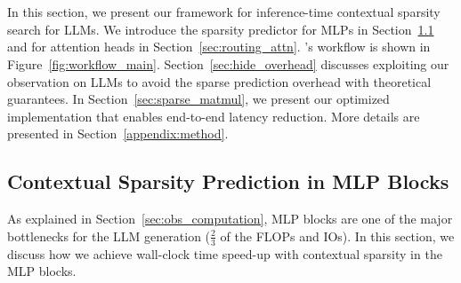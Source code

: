 
\section{\name}
\label{sec:method}

In this section, we present our framework for inference-time contextual sparsity search for LLMs.  We introduce the sparsity predictor for MLPs in Section~\ref{sec:routing_mlp} and for attention heads in Section~\ref{sec:routing_attn}. \name{}'s workflow is shown in Figure~\ref{fig:workflow_main}.  Section~\ref{sec:hide_overhead} discusses exploiting our observation on LLMs to avoid the sparse prediction overhead with theoretical guarantees. In Section~\ref{sec:sparse_matmul}, we present our optimized implementation that enables end-to-end latency reduction. More details are presented in Section~\ref{appendix:method}.





\subsection{Contextual Sparsity Prediction in MLP Blocks}
\label{sec:routing_mlp}
As explained in Section~\ref{sec:obs_computation}, MLP blocks are one of the major bottlenecks for the LLM generation ($\frac{2}{3}$ of the FLOPs and IOs). In this section, we discuss how we achieve wall-clock time speed-up with contextual sparsity in the MLP blocks.

